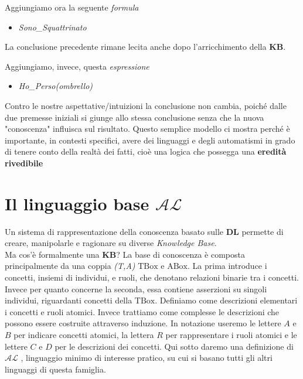 Aggiungiamo ora la seguente \textit{formula}
\begin{itemize}
	\item[] \textit{Sono\_Squattrinato}
\end{itemize}
La conclusione precedente rimane lecita anche dopo l'arricchimento della \textbf{KB}.

Aggiungiamo, invece, questa \textit{espressione}
\begin{itemize}
	\item[] \textit{Ho\_Perso(ombrello)}
\end{itemize}
Contro le nostre aspettative/intuizioni la conclusione non cambia, poiché dalle due premesse 
iniziali si giunge allo stessa conclusione senza che la nuova "conoscenza" influisca sul risultato.
Questo semplice modello ci mostra perché è importante, in contesti
specifici, avere dei linguaggi e degli automatismi in grado di tenere conto della 
realtà dei fatti, cioè una logica che possegga una \textbf{eredità rivedibile}
\section{Il linguaggio base $\mathcal{AL}$}
Un sistema di rappresentazione della conoscenza basato sulle \textbf{DL}
permette di creare, manipolarle e ragionare su diverse \textit{Knowledge Base}.\\
Ma cos'è formalmente una \textbf{KB}?
La base di conoscenza è composta principalmente da una coppia \textit{(T,A)} 
$\mathrm{TBox} \text{ e } \mathrm{ABox}$.
La prima introduce i concetti, insiemi di individui, e ruoli, che
denotano relazioni binarie tra i concetti. \\
Invece per quanto concerne la seconda, essa contiene asserzioni su singoli individui, riguardanti 
concetti della $\mathrm{TBox}$.
Definiamo come descrizioni elementari i concetti e ruoli atomici. Invece trattiamo come 
complesse le descrizioni che possono essere costruite attraverso induzione.
In notazione useremo le lettere $A$ e $B$ per indicare
concetti atomici, la lettera $R$ per rappresentare i ruoli atomici e le lettere $C$ e
$D$ per le descrizioni dei concetti. Qui sotto daremo una definizione di $\mathcal{AL}$ \cite{DLHandbook},
linguaggio minimo di interesse pratico, su cui si basano tutti gli altri linguaggi di questa famiglia.

